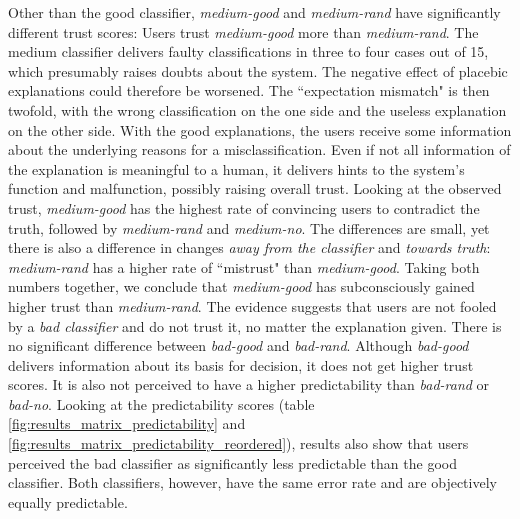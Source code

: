 Other than the good classifier, \textit{medium-good} and \textit{medium-rand} have significantly different trust scores: Users trust \textit{medium-good} more than \textit{medium-rand}. The medium classifier delivers faulty classifications in three to four cases out of 15, which presumably raises doubts about the system. The negative effect of placebic explanations could therefore be worsened. The ``expectation mismatch" is then twofold, with the wrong classification on the one side and the useless explanation on the other side. With the good explanations, the users receive some information about the underlying reasons for a misclassification. Even if not all information of the explanation is meaningful to a human, it delivers hints to the system's function and malfunction, possibly raising overall trust. Looking at the observed trust, \textit{medium-good} has the highest rate of convincing users to contradict the truth, followed by \textit{medium-rand} and \textit{medium-no}. The differences are small, yet there is also a difference in changes \textit{away from the classifier} and \textit{towards truth}: \textit{medium-rand} has a higher rate of ``mistrust" than \textit{medium-good}. Taking both numbers together, we conclude that \textit{medium-good} has subconsciously gained higher trust than \textit{medium-rand}.\newline
The evidence suggests that users are not fooled by a \textit{bad classifier} and do not trust it, no matter the explanation given. There is no significant difference between \textit{bad-good} and \textit{bad-rand}. Although \textit{bad-good} delivers information about its basis for decision, it does not get higher trust scores. It is also not perceived to have a higher predictability than \textit{bad-rand} or \textit{bad-no}. Looking at the predictability scores (table \ref{fig:results_matrix_predictability} and \ref{fig:results_matrix_predictability_reordered}), results also show that users perceived the bad classifier as significantly less predictable than the good classifier. Both classifiers, however, have the same error rate and are objectively equally predictable.\newline
